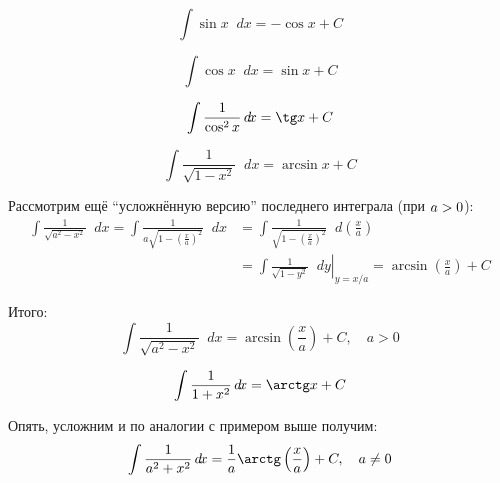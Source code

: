 \documentclass[a4paper,12pt]{article}
\newcommand{\diff}{\mathop{}\!d\!}
\begin{document}
  \begin{equation}
    \int \sin x \diff x = {-}\cos x + C
  \end{equation}
  
  \begin{equation}
    \int \cos x \diff x = \sin x + C
  \end{equation}
  
  \begin{equation}
    \int \frac{1}{\cos^2 x} \diff x = \tg x + C
  \end{equation}
  
  \begin{equation}
    \int \frac{1}{\sqrt{1 - x^2}} \diff x = \arcsin x + C
  \end{equation}
  
  \begin{example}
    Рассмотрим ещё ``усложнённую версию'' последнего интеграла (при $a \hm> 0$):
    \begin{equation*}
    \begin{split}
      \int \frac{1}{\sqrt{a^2 - x^2}} \diff x
        = \int \frac{1}{a \sqrt{1 - \left(\frac{x}{a}\right)^2}} \diff x
        &= \int \frac{1}{\sqrt{1 - \left(\frac{x}{a}\right)^2}} \diff \left(\frac{x}{a}\right)\\
        &= \left.\int \frac{1}{\sqrt{1 - y^2}} \diff y \right|_{y = x/a}
        = \arcsin{\left(\frac{x}{a}\right)} + C
    \end{split}
    \end{equation*}
    
    Итого:  
    \begin{equation}\label{eq:int-a-arcsin}
      \int \frac{1}{\sqrt{a^2 - x^2}} \diff x = \arcsin{\left(\frac{x}{a}\right)} + C,\quad a > 0
    \end{equation}
  \end{example}
  
  \begin{equation}
    \int \frac{1}{1 + x^2} \diff x = \arctg x + C
  \end{equation}
  
  Опять, усложним и по аналогии с примером выше получим:
  \begin{equation}\label{eq:int-a-arctan}
    \int \frac{1}{a^2 + x^2} \diff x = \frac{1}{a} \arctg\left(\frac{x}{a}\right) + C,\quad a \not= 0
  \end{equation}
  
\end{document}
